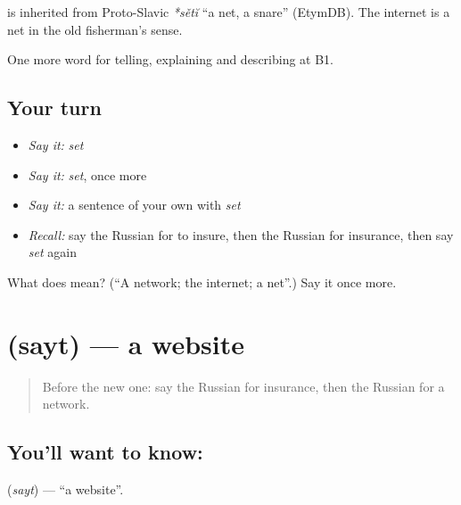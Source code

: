 \begin{cousinweb}
\textbf{} is inherited from Proto-Slavic \emph{*sětĭ} \textquotedblleft{}a net, a snare\textquotedblright{} (EtymDB). The internet is a net in the old fisherman’s sense.
\end{cousinweb}

\begin{grammarlens}[title={What you've built}]
One more word for telling, explaining and describing at B1.
\end{grammarlens}

\subsection*{Your turn}
\begin{itemize}
\raggedright
  \item \emph{Say it:} \emph{set}
  \item \emph{Say it:} \emph{set}, once more
  \item \emph{Say it:} a sentence of your own with \emph{set}
  \item \emph{Recall:} say the Russian for to insure, then the Russian for insurance, then say \emph{set} again
\end{itemize}

\begin{tcolorbox}[breakable,colback=teal!4,colframe=teal!35!black,title={Before you move on}]
What does  mean? (\textquotedblleft{}A network; the internet; a net\textquotedblright{}.) Say it once more.
\end{tcolorbox}
\section[\texorpdfstring{\ru{сайт} (sayt)}{сайт (sayt)}]{ (sayt) — a website}

\label{lesson:RU-C399-sayt}



\begin{quote}
Before the new one: say the Russian for insurance, then the Russian for a network.
\end{quote}

\subsection*{You'll want to know: }
\textbf{} (\emph{sayt}) — \textquotedblleft{}a website\textquotedblright{}.

